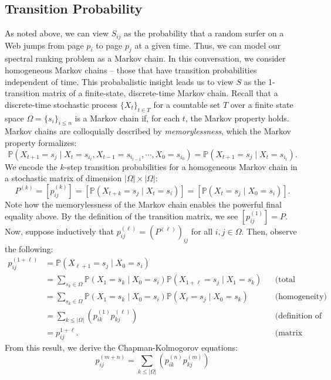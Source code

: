 \documentclass[11pt,letterpaper]{amsart}
\newcommand{\iterate}[2]{#1^{(#2)}}
\newcommand{\parens}[1]{ \left( #1 \right) }
\newcommand{\prob}{\mathbb{P}}
\begin{document}
\subsection{Transition Probability}
As noted above, we can view $S_{ij}$ as the probability that a random surfer on
a Web jumps from page $p_i$ to page $p_j$ at a given time. Thus, we can model
our spectral ranking problem as a Markov chain. In this conversation, we
consider homogeneous Markov chains -- those that have transition probabilities
independent of time. This probabalistic insight leads us to view $S$ as the
1-transition matrix of a finite-state, discrete-time Markov chain. Recall that a
discrete-time stochastic process $\{X_t\}_{t \in T}$ for a countable set $T$
over a finite state space $\Omega = \{s_i\}_{i\leq n}$ is a Markov chain if, for
each $t$, the Markov property holds. Markov chains are colloquially described by
\textit{memorylessness}, which the Markov property formalizes:
\begin{equation*}
  \prob(X_{t+1} = s_j \mid X_t = s_{i_t}, X_{t-1} = s_{i_{t-1}},\cdots, X_0 =
s_{i_0}) = \prob(X_{t+1} = s_j \mid X_t=s_{i_{t}}).
\end{equation*}
We encode the $k$-step transition probabilities for a homogeneous Markov chain
in a stochastic matrix of dimension $|\Omega| \times |\Omega|$:
\begin{equation}
  \iterate{P}{k} = [ \iterate{p}{k}_{ij} ] = [ \prob(X_{t+k} = s_j \mid X_t =
s_i) ] = [ \prob(X_{t} = s_j \mid X_0 = s_i) ].
\end{equation}
Note how the memorylessness of the Markov chain enables the powerful final
equality above. By the definition of the transition matrix, we see
$ [ \iterate{p}{1}_{ij} ] = P$. Now, suppose inductively that
$\iterate{p}{\ell}_{ij} = \parens{\iterate{P}{\ell}}_{ij}$ for all
$i, j \in \Omega$. Then, observe the following:
\begin{align*}
  \iterate{p}{1+\ell}_{ij} &= \prob(X_{\ell+1} = s_j \mid X_0 = s_i) \\
                           &= \sum_{s_k\in\Omega}{\prob(X_1 = s_k \mid X_0 = s_i) \prob(X_{1+\ell} = s_j \mid
                             X_1 = s_k)} && \text{(total probability)} \\
                           &= \sum_{s_k\in\Omega}{\prob(X_1 = s_k \mid X_0 = s_i) \prob(X_{\ell} = s_j \mid X_0 = s_k)} &&
                                                                                                                           \text{(homogeneity)} \\
                           &= \sum_{k\leq
                             |\Omega|}{\parens{\iterate{p}{1}_{ik}\iterate{p}{\ell}_{kj}}}
                           && \text{(definition of transition matrix)}\\
                           &= p^{1+\ell}_{ij}. && \text{(matrix multiplication)}
\end{align*}
From this result, we derive the Chapman-Kolmogorov equations:
\begin{equation}
  \iterate{p}{m+n}_{ij} = \sum_{k\leq |\Omega|}{\parens{\iterate{p}{n}_{ik} \iterate{p}{m}_{kj}}}
\end{equation}
\end{document}
